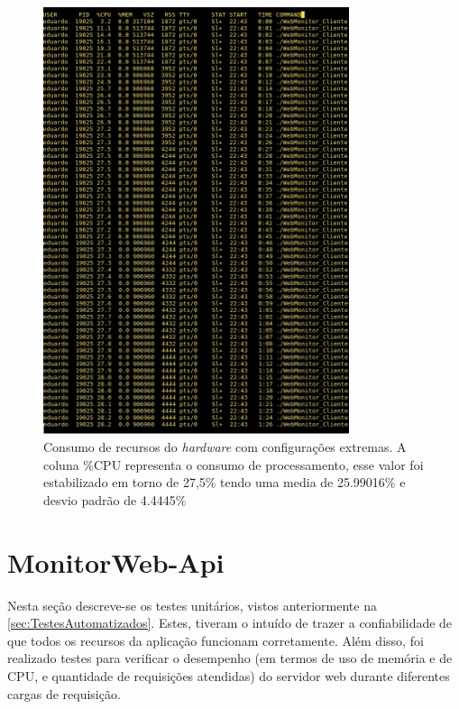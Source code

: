 \begin{figure}[H]
	\centering
	\includegraphics[width=0.8\textwidth]{figuras/monitorWebCliTeste2/hardwareTeste2.jpg}
	\caption[Consumo de recursos do \textit{hardware} com configuraçãos extremas.]{Consumo de recursos do \textit{hardware} com configurações extremas.  A coluna \%CPU representa o consumo de processamento, esse valor foi estabilizado em torno de 27,5\% tendo uma media de 25.99016\% e desvio padrão de 4.4445\%}
	\label{Img:consumo2}
\end{figure}


\section{MonitorWeb-Api} \label{sec:MonitorWeb-ApiTeste}

Nesta seção descreve-se os testes unitários, vistos anteriormente na \autoref{sec:TestesAutomatizados}. Estes, tiveram o intuído de trazer a confiabilidade de que todos os recursos da aplicação funcionam corretamente. Além disso, foi realizado testes para verificar o desempenho (em termos de uso de memória e de CPU, e quantidade de requisições atendidas) do servidor web durante diferentes cargas de requisição.

